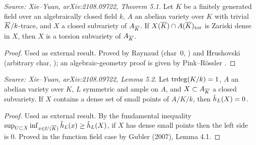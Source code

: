 \begin{theorem}
  \label{thm:maninMumford}
  \textit{Source: Xie--Yuan, arXiv:2108.09722, Theorem 5.1.}
  Let \(K\) be a finitely generated field over an algebraically closed field \(k\),
  \(A\) an abelian variety over \(K\) with trivial \(\overline{K}/k\)-trace, and \(X\) a closed
  subvariety of \(A_{\overline{K}}\).
  If \(X(\overline{K}) \cap A(\overline{K})_{\rm tor}\) is Zariski dense in \(X\), then \(X\) is a torsion
  subvariety of \(A_{\overline{K}}\).
\end{theorem}

\begin{proof}
  Used as external result.
  Proved by Raynaud (char~0, \cite{Raynaud1983}) and Hrushovski (arbitrary char,
  \cite{Hrushovski2001}); an algebraic-geometry proof is given by Pink--R\"{o}ssler
  \cite{Pink2002a}.
\end{proof}

\begin{lemma}
  \label{lem:fundamentalInequality}
  \textit{Source: Xie--Yuan, arXiv:2108.09722, Lemma 5.2.}
  Let \(\operatorname{trdeg}(K/k) = 1\), \(A\) an abelian variety over \(K\), \(L\) symmetric and ample
  on \(A\), and \(X \subset A_{\overline{K}}\) a closed subvariety.
  If \(X\) contains a dense set of small points of \(A/K/k\), then \(\hat{h}_L(X) = 0\).
\end{lemma}

\begin{proof}
  Used as external result.
  By the fundamental inequality \(\sup_{U \subset X}\inf_{x \in U(\overline{K})}\hat{h}_L(x) \geq \hat{h}_L(X)\),
  if \(X\) has dense small points then the left side is \(0\).
  Proved in the function field case by Gubler (2007), Lemma 4.1.
\end{proof}

